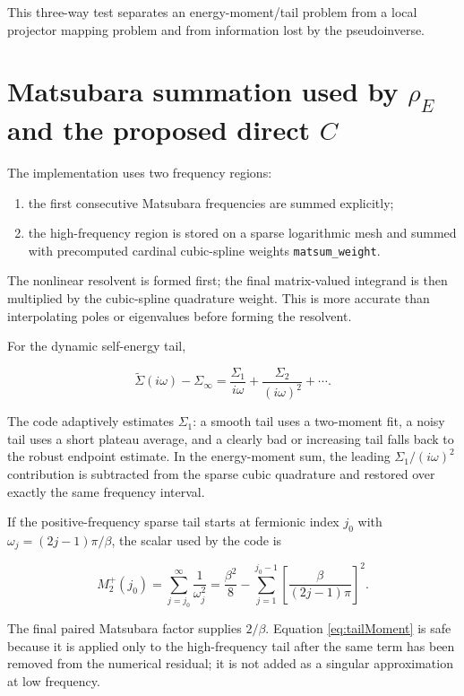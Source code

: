 \documentclass[11pt]{article}
\numberwithin{equation}{section}
\newcommand{\Sig}{\widetilde\Sigma}
\newcommand{\code}[1]{\texttt{#1}}
\begin{document}
This three-way test separates an energy-moment/tail problem from a local
projector mapping problem and from information lost by the pseudoinverse.

\section{Matsubara summation used by $\rho_E$ and the proposed direct $C$}

The implementation uses two frequency regions:

\begin{enumerate}
\item the first consecutive Matsubara frequencies are summed explicitly;
\item the high-frequency region is stored on a sparse logarithmic mesh and
      summed with precomputed cardinal cubic-spline weights
      \code{matsum\_weight}.
\end{enumerate}

The nonlinear resolvent is formed first; the final matrix-valued integrand is
then multiplied by the cubic-spline quadrature weight.  This is more accurate
than interpolating poles or eigenvalues before forming the resolvent.

For the dynamic self-energy tail,

\begin{equation}
 \Sig(i\omega)-\Sigma_\infty
 =\frac{\Sigma_1}{i\omega}
 +\frac{\Sigma_2}{(i\omega)^2}+\cdots.
\end{equation}

The code adaptively estimates $\Sigma_1$: a smooth tail uses a two-moment fit,
a noisy tail uses a short plateau average, and a clearly bad or increasing
tail falls back to the robust endpoint estimate.  In the energy-moment sum,
the leading $\Sigma_1/(i\omega)^2$ contribution is subtracted from the sparse
cubic quadrature and restored over exactly the same frequency interval.

If the positive-frequency sparse tail starts at fermionic index $j_0$ with
$\omega_j=(2j-1)\pi/\beta$, the scalar used by the code is

\begin{equation}
 M_2^+(j_0)=\sum_{j=j_0}^{\infty}\frac{1}{\omega_j^2}
 =\frac{\beta^2}{8}
 -\sum_{j=1}^{j_0-1}
 \left[\frac{\beta}{(2j-1)\pi}\right]^2.
 \label{eq:tailMoment}
\end{equation}

The final paired Matsubara factor supplies $2/\beta$.  Equation
\eqref{eq:tailMoment} is safe because it is applied only to the high-frequency
tail after the same term has been removed from the numerical residual; it is
not added as a singular approximation at low frequency.
\end{document}
